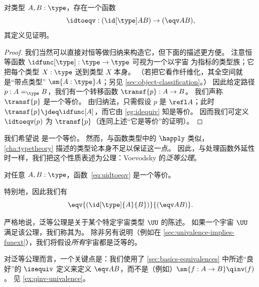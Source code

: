 \begin{lem}\label{thm:idtoeqv}
  对类型 $A,B:\type$，存在一个函数
  \begin{equation}\label{eq:uidtoeqv}
    \idtoeqv : (\id[\type]AB) \to (\eqv A B),
  \end{equation}
  其定义见证明。
\end{lem}
\begin{proof}
  我们当然可以直接对恒等做归纳来构造它，但下面的描述更方便。
  注意恒等函数 $\idfunc[\type]:\type\to\type$ 可视为一个以宇宙 \type 为指标的类型族；它把每个类型 $X:\type$ 送到类型 $X$ 本身。
  （若把它看作纤维化，其全空间就是“带点类型” $\sm{A:\type}A$；另见 \cref{sec:object-classification}。）
  因此给定路径 $p:A =_\type B$，我们有一个转移函数 $\transf{p}:A \to B$。
  我们声称 $\transf{p}$ 是一个等价。
  由归纳法，只需假设 $p$ 是 $\refl A$；此时 $\transf{p} \jdeq \idfunc[A]$，而它由 \cref{eg:idequiv} 知是等价。
  因而我们可定义 $\idtoeqv(p)$ 为 $\transf{p}$（连同上述“它是等价”的证明）。
\end{proof}

我们希望说 \idtoeqv 是一个等价。
然而，与函数类型中的 $\happly$ 类似，\cref{cha:typetheory} 描述的类型论本身不足以保证这一点。
因此，与处理函数外延性时一样，我们把这个性质表述为公理：Voevodsky 的\emph{泛等公理}。

\begin{axiom}[泛等]\label{axiom:univalence}
  对任意 $A,B:\type$，函数~\eqref{eq:uidtoeqv} 是一个等价。
\end{axiom}

特别地，因此我们有
  \[
\eqv{(\id[\type]{A}{B})}{(\eqv A B)}.
\]

严格地说，泛等公理是关于某个特定宇宙类型 $\UU$ 的陈述。
如果一个宇宙 $\UU$ 满足该公理，我们称其为。
%
%
除非另有说明（例如在 \cref{sec:univalence-implies-funext}），我们将假设\emph{所有}宇宙都是泛等的。

\begin{rmk}
  对泛等公理而言，一个关键点是：我们使用了 \cref{sec:basics-equivalences} 中所述“良好”的 $\isequiv$ 定义来定义 $\eqv AB$，而不是（例如）$\sm{f:A\to B} \qinv(f)$。
  见 \cref{ex:qinv-univalence}。
\end{rmk}

